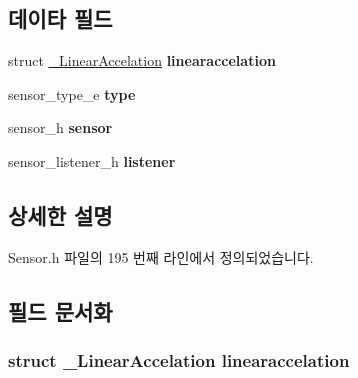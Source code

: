\subsection*{데이타 필드}
\begin{DoxyCompactItemize}
\item 
\hypertarget{struct___linear_accelation_extend_a12d1cee667dc4d73c2096e6e7b9951bf}{struct \hyperlink{struct___linear_accelation}{\-\_\-\-Linear\-Accelation} {\bfseries linearaccelation}}\label{struct___linear_accelation_extend_a12d1cee667dc4d73c2096e6e7b9951bf}

\item 
\hypertarget{struct___linear_accelation_extend_abffb09766da2fc510a79bb51f82a36e1}{sensor\-\_\-type\-\_\-e {\bfseries type}}\label{struct___linear_accelation_extend_abffb09766da2fc510a79bb51f82a36e1}

\item 
\hypertarget{struct___linear_accelation_extend_a5bae9b7801bc3808411925cde81d3f26}{sensor\-\_\-h {\bfseries sensor}}\label{struct___linear_accelation_extend_a5bae9b7801bc3808411925cde81d3f26}

\item 
\hypertarget{struct___linear_accelation_extend_aa977dfb866b24fd7d9a20a9a01b2fd1f}{sensor\-\_\-listener\-\_\-h {\bfseries listener}}\label{struct___linear_accelation_extend_aa977dfb866b24fd7d9a20a9a01b2fd1f}

\end{DoxyCompactItemize}


\subsection{상세한 설명}


Sensor.\-h 파일의 195 번째 라인에서 정의되었습니다.



\subsection{필드 문서화}
\hypertarget{struct___linear_accelation_extend_a12d1cee667dc4d73c2096e6e7b9951bf}{
\subsubsection[{linearaccelation}]{\setlength{\rightskip}{0pt plus 5cm}struct {\bf \-\_\-\-Linear\-Accelation} linearaccelation}}\label{struct___linear_accelation_extend_a12d1cee667dc4d73c2096e6e7b9951bf}


